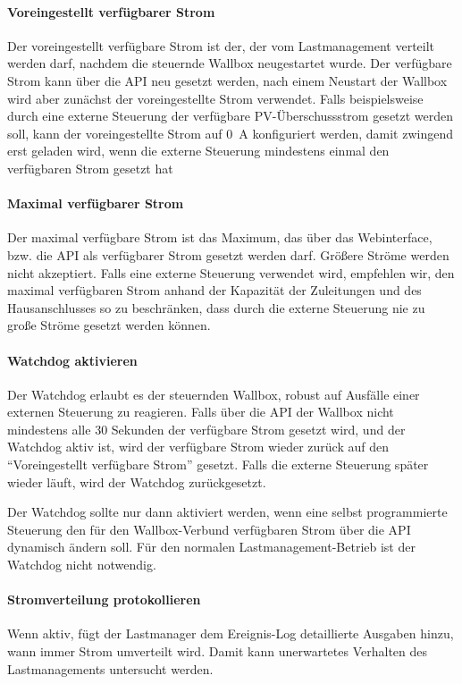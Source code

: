 \documentclass[a4paper,10pt]{article}
\newcommand{\hint}[1]{\begin{tcolorbox}[colback=boxgray,colframe=black,coltext=
white,title=Hinweis,left*=2mm,right*=2mm,boxsep=1mm,bottom=1mm,top=1mm]#1\end{tcolorbox}}
\begin{document}
\begin{multicols*}{2}
	\paragraph{Voreingestellt verfügbarer Strom}
	Der voreingestellt verfügbare Strom ist der, der vom Lastmanagement verteilt werden darf, nachdem die steuernde Wallbox
	neugestartet wurde. Der verfügbare Strom kann über die API neu gesetzt werden, nach einem Neustart der Wallbox wird aber
	zunächst der voreingestellte Strom verwendet. Falls beispielsweise durch eine externe Steuerung der verfügbare PV-Überschussstrom
	gesetzt werden soll, kann der voreingestellte Strom auf \SI{0}{\ampere} konfiguriert werden, damit zwingend erst geladen wird,
	wenn die externe Steuerung mindestens einmal den verfügbaren Strom gesetzt hat
	\vspace{-0.2cm}
	\paragraph{Maximal verfügbarer Strom}
	Der maximal verfügbare Strom ist das Maximum, das über das Webinterface, bzw. die API als verfügbarer Strom gesetzt werden darf.
	Größere Ströme werden nicht akzeptiert. Falls eine externe Steuerung verwendet wird, empfehlen wir, den maximal verfügbaren Strom
	anhand der Kapazität der Zuleitungen und des Hausanschlusses so zu beschränken, dass durch die externe Steuerung nie zu große
	Ströme gesetzt werden können.

	\paragraph{Watchdog aktivieren}
	Der Watchdog erlaubt es der steuernden Wallbox, robust auf Ausfälle einer externen Steuerung zu reagieren. Falls über die API der Wallbox
	nicht mindestens alle 30 Sekunden der verfügbare Strom gesetzt wird, und der Watchdog aktiv ist, wird der verfügbare Strom wieder zurück auf den
	\enquote{Voreingestellt verfügbare Strom} gesetzt. Falls die externe Steuerung später wieder läuft, wird der Watchdog zurückgesetzt.
	\hint{Der Watchdog sollte nur dann aktiviert werden,
	wenn eine selbst programmierte Steuerung den für den Wallbox-Verbund verfügbaren Strom über die API dynamisch ändern soll.
	Für den normalen Lastmanagement-Betrieb ist der Watchdog nicht notwendig.}

	\paragraph{Stromverteilung protokollieren}
	Wenn aktiv, fügt der Lastmanager dem Ereignis-Log detaillierte Ausgaben hinzu, wann immer Strom umverteilt wird. Damit kann unerwartetes Verhalten des
	Lastmanagements untersucht werden.


\end{multicols*}
\end{document}
